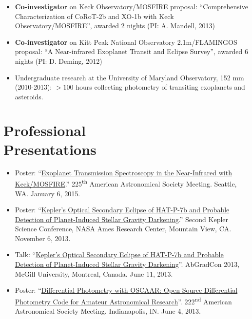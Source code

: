 \documentclass[margin]{res}
\begin{document}
\begin{resume}
\begin{itemize}
\item {\bf Co-investigator} on Keck Observatory/MOSFIRE proposal: ``Comprehensive Characterization of CoRoT-2b and XO-1b with Keck Observatory/MOSFIRE'', awarded 2 nights (PI: A. Mandell, 2013)

\item {\bf Co-investigator} on Kitt Peak National Observatory 2.1m/FLAMINGOS proposal: ``A Near-infrared Exoplanet Transit and Eclipse Survey'', awarded 6 nights (PI: D. Deming, 2012)

\item Undergraduate research at the University of Maryland Observatory, 152 mm (2010-2013): $>100$ hours collecting photometry of transiting exoplanets and asteroids. \\
\end{itemize}



\section{Professional\\ Presentations} 
\begin{itemize}  %

\item Poster: ``\href{http://adsabs.harvard.edu/abs/2015AAS...22525710M}{Exoplanet Transmission Spectroscopy in the Near-Infrared with Keck/MOSFIRE}.'' 225\textsuperscript{th} American Astronomical Society Meeting. Seattle, WA. January 6, 2015.

\item Poster: ``\href{http://nexsci.caltech.edu/conferences/KeplerII/posters/morris.pdf}{Kepler's Optical Secondary Eclipse of HAT-P-7b and Probable Detection of Planet-Induced Stellar Gravity Darkening}.'' Second Kepler Science Conference, NASA Ames Research Center, Mountain View, CA. November 6, 2013. 

\item Talk: ``\href{http://youtu.be/ZMfbkCzzQUE}{Kepler's Optical Secondary Eclipse of HAT-P-7b and Probable Detection of Planet-Induced Stellar Gravity Darkening}''. AbGradCon 2013, McGill University, Montreal, Canada. June 11, 2013.

\item Poster: ``\href{http://adsabs.harvard.edu/abs/2013AAS...22221717M}{Differential Photometry with OSCAAR: Open Source Differential Photometry Code for Amateur Astronomical Research}''. 222\textsuperscript{nd} American Astronomical Society Meeting. Indianapolis, IN. June 4, 2013.


\end{itemize}
\end{resume}
\end{document}
